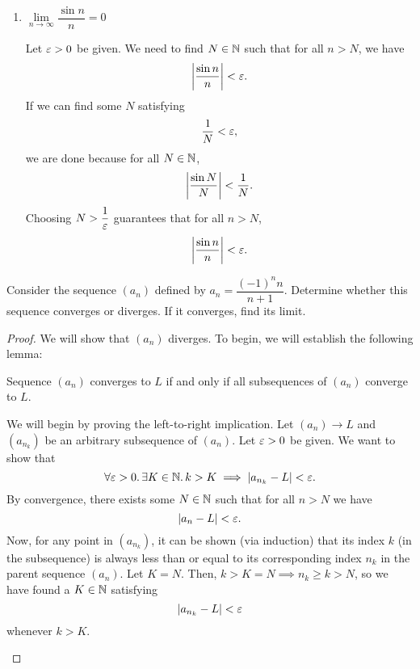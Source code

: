 \begin{problem}
\begin{enumerate}[label=(\alph*)]
    \item $\lim\limits_{n \to \infty} \dfrac{\sin n}{n} = 0$

      Let $\varepsilon > 0$ be given. We need to find $N \in \mathbb{N}$ such that for all $n > N$, we have 
      \[
        \left\lvert \frac{\sin n}{n} \right\rvert < \varepsilon.
      \]
      If we can find some $N$ satisfying
      \[
        \frac{1}{N} < \varepsilon,
      \]
      we are done because for all $N \in \mathbb{N}$,
      \[
        \left\lvert \frac{\sin N}{N} \right\rvert < \dfrac{1}{N}.
      \]
      Choosing $N > \dfrac{1}{\varepsilon}$ guarantees that for all $n > N$,
      \[
        \left\lvert \frac{\sin n}{n} \right\rvert < \varepsilon.
      \]

  \end{enumerate}

\end{problem}

\begin{problem}
  Consider the sequence $(a_{n})$ defined by $a_{n} = \dfrac{(-1)^{n} n}{n + 1}$.
  Determine whether this sequence converges or diverges. If it converges, find
  its limit.

  \begin{proof}
    We will show that $(a_{n})$ diverges. To begin, we will establish the following lemma:
    
    \begin{lemma} \label{lem:convergence-of-subsequences-iff-convergence-of-sequence}
      Sequence $(a_{n})$ converges to $L$ if and only if all subsequences of $(a_{n})$ converge to $L$.
    \end{lemma}

    \begin{subproof}
      We will begin by proving the left-to-right implication. Let $(a_{n}) \to L$ 
      and $(a_{n_{k}})$ be an arbitrary subsequence of $(a_{n})$.
      Let $\varepsilon > 0$ be given. We want to show that 
      \[
        \forall \varepsilon > 0.\, \exists K \in \mathbb{N}.\,  k > K \implies \left\lvert a_{n_{k}} - L \right\rvert < \varepsilon.
      \]
      By convergence, there exists some $N \in \mathbb{N}$ such that for all $n > N$ we have
      \[
        \left\lvert a_{n} - L \right\rvert < \varepsilon.
      \]
      Now, for any point in $(a_{n_{k}})$, it can be shown (via induction) that 
      its index $k$ (in the subsequence) is always less than or equal to its
      corresponding index $n_{k}$ in the parent sequence $(a_{n})$. Let $K = N$. Then, 
      $k > K = N \implies n_{k} \geq k > N$, so we have found a $K \in \mathbb{N}$ satisfying 
      \[
        \left\lvert a_{n_{k}} - L \right\rvert < \varepsilon
      \]
      whenever $k > K$.


\end{subproof}
\end{proof}
\end{problem}
